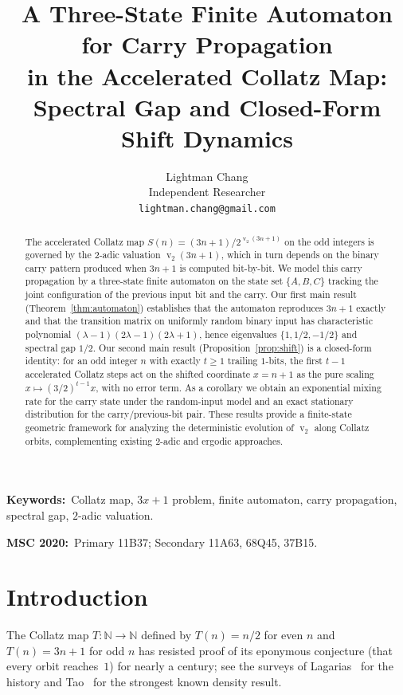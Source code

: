 \documentclass[11pt,a4paper]{article}
\title{\Large A Three-State Finite Automaton for Carry Propagation\\
in the Accelerated Collatz Map:\\[4pt]
\large Spectral Gap and Closed-Form Shift Dynamics}
\author{Lightman Chang\\
Independent Researcher\\
\texttt{lightman.chang@gmail.com}}
\date{}
\theoremstyle{definition}
\theoremstyle{remark}
\DeclareMathOperator{\val}{v}
\newcommand{\N}{\mathbb{N}}
\begin{document}
\maketitle

\begin{abstract}
The accelerated Collatz map $S(n) = (3n+1)/2^{\val_2(3n+1)}$ on the odd
integers is governed by the $2$-adic valuation $\val_2(3n+1)$, which in
turn depends on the binary carry pattern produced when $3n+1$ is computed
bit-by-bit.  We model this carry propagation by a three-state finite
automaton on the state set $\{A,B,C\}$ tracking the joint configuration
of the previous input bit and the carry.  Our first main result
(Theorem~\ref{thm:automaton}) establishes that the automaton reproduces
$3n+1$ exactly and that the transition matrix on uniformly random binary
input has characteristic polynomial $(\lambda-1)(2\lambda-1)(2\lambda+1)$,
hence eigenvalues $\{1, 1/2, -1/2\}$ and spectral gap $1/2$.  Our second
main result (Proposition~\ref{prop:shift}) is a closed-form identity:
for an odd integer $n$ with exactly $t \geq 1$ trailing $1$-bits, the
first $t-1$ accelerated Collatz steps act on the shifted coordinate
$x = n+1$ as the pure scaling $x \mapsto (3/2)^{t-1} x$, with no error
term.  As a corollary we obtain an exponential mixing rate for the carry
state under the random-input model and an exact stationary distribution
for the carry/previous-bit pair.  These results provide a finite-state
geometric framework for analyzing the deterministic evolution of
$\val_2$ along Collatz orbits, complementing existing $2$-adic and
ergodic approaches.
\end{abstract}

\noindent\textbf{Keywords:}~Collatz map, $3x{+}1$ problem,
finite automaton, carry propagation, spectral gap, $2$-adic valuation.

\smallskip
\noindent\textbf{MSC 2020:}~Primary 11B37; Secondary 11A63, 68Q45, 37B15.

\section{Introduction}\label{sec:intro}

The Collatz map $T \colon \N \to \N$ defined by $T(n) = n/2$ for even $n$
and $T(n) = 3n+1$ for odd $n$ has resisted proof of its eponymous
conjecture (that every orbit reaches~$1$) for nearly a century; see
the surveys of Lagarias~\cite{Lagarias1985,Lagarias2010} for the
history and Tao~\cite{Tao2022} for the strongest known density result.
\end{document}
